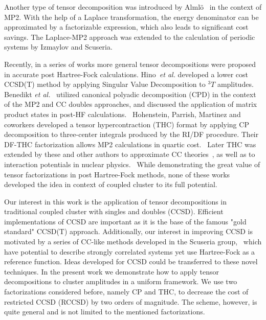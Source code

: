 Another type of tensor decomposition was introduced by 
Alml{\"o}~\cite{almlof1991elimination} in the context of MP2. With the help of 
a Laplace transformation, the energy denominator can be approximated by a 
factorizable expression, which also leads to significant cost savings. The 
Laplace-MP2 approach was extended to the calculation of periodic systems by 
Izmaylov and Scuseria.~\cite{izmaylov2008resolution}

Recently, in a series of works more general tensor decompositions were proposed 
in accurate post Hartree-Fock calculations. Hino~\emph{et al.} developed a 
lower cost CCSD(T) method by applying Singular Value Decomposition to ${}^3 T$ 
amplitudes.~\cite{hino2004singular} Benedikt \emph{et al.}~\cite{benedict_mp2, 
benedict_ccd} utilized 
canonical polyadic decomposition (CPD) in the context of the MP2 and CC 
doubles approaches, and discussed the application of matrix product 
states in 
post-HF calculations.~\cite{benedikt_mps} Hohenstein, Parrish, Martinez and 
coworkers developed a tensor hypercontraction (THC) format by applying CP 
decomposition to three-center integrals produced by the RI/DF procedure. Their 
DF-THC factorization allows MP2 calculations in quartic 
cost.~\cite{kokkila2015tensor} Later THC was extended by these and other 
authors to approximate 
CC theories~\cite{parrish2014communication, hohenstein2013tensor}, as well as 
to interaction potentials in nuclear physics.~\cite{parrish2013exact} While 
demonstrating the great value of tensor 
factorizations in post Hartree-Fock methods, none of these 
works developed the idea in context of coupled cluster to its full potential.

Our interest in this work is the application of tensor decompositions in
traditional coupled cluster with singles and doubles (CCSD). Efficient 
implementations of CCSD are important as it is the base of the famous "gold 
standard" CCSD(T) approach. Additionally, our interest in improving CCSD is 
motivated by a series of CC-like methods developed in the Scuseria 
group,~\cite{degroote2016polynomial, gomez2017attenuated, 
qiu2017projected2, hermes2017combining} which have potential to describe 
strongly correlated systems yet use Hartree-Fock as a reference function. Ideas 
developed for CCSD could be transferred to these novel techniques. In the 
present work we demonstrate how to apply tensor decompositions to cluster 
amplitudes in a uniform framework. We use two factorizations considered before, 
namely CP and THC, to decrease the cost of restricted CCSD (RCCSD) by two orders 
of magnitude. The scheme, however, is quite general and is not limited to the 
mentioned factorizations.  

